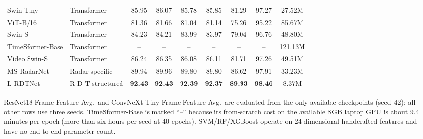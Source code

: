 \begin{table}[!t]
{\begin{tabular}{llccccccc}
Swin-Tiny & Transformer & 85.95 & 86.07 & 85.78 & 85.85 & 81.29 & 97.27 & 27.52M \\
ViT-B/16 & Transformer & 81.36 & 81.66 & 81.04 & 81.14 & 75.26 & 95.22 & 85.67M \\
Swin-S & Transformer & 84.23 & 84.21 & 83.99 & 83.97 & 79.04 & 96.76 & 48.80M \\
TimeSformer-Base & Transformer & -- & -- & -- & -- & -- & -- & 121.13M \\
Video Swin-S & Transformer & 86.24 & 86.35 & 86.08 & 86.11 & 81.71 & 97.26 & 49.51M \\
\hline
MS-RadarNet & Radar-specific & 89.94 & 89.96 & 89.80 & 89.80 & 86.62 & 97.91 & 33.23M \\
\hline
L-RDTNet & R-D-T structured & \textbf{92.43} & \textbf{92.43} & \textbf{92.39} & \textbf{92.37} & \textbf{89.93} & \textbf{98.46} & 8.37M \\
\hline
\end{tabular}}
\vspace{2pt}
\parbox{\textwidth}{\scriptsize ResNet18-Frame Feature Avg.\ and ConvNeXt-Tiny Frame Feature Avg.\ are evaluated from the only available checkpoints (seed~42); all other rows use three seeds. TimeSformer-Base is marked ``--'' because its from-scratch cost on the available 8\,GB laptop GPU is about 9.4 minutes per epoch (more than six hours per seed at 40 epochs). SVM/RF/XGBoost operate on 24-dimensional handcrafted features and have no end-to-end parameter count.}
\end{table}
